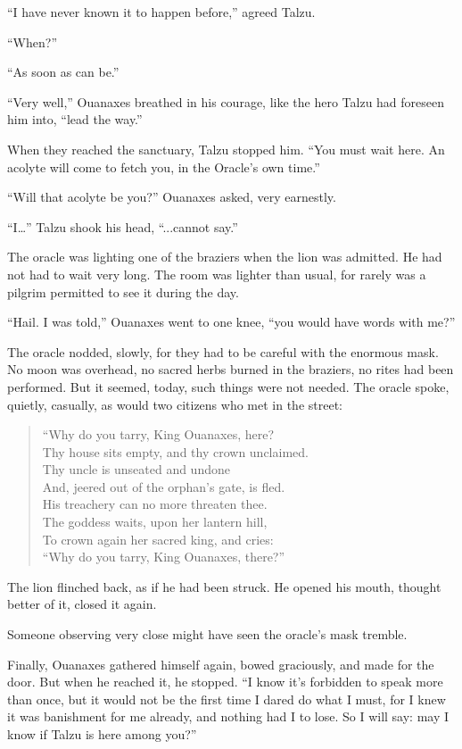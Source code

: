 ``I have never known it to happen before,'' agreed Talzu.

``When?''

``As soon as can be.''

``Very well,'' Ouanaxes breathed in his courage, like the hero Talzu had foreseen him into, ``lead the way.''

When they reached the sanctuary, Talzu stopped him. ``You must wait here. An acolyte will come to fetch you, in the Oracle's own time.''

``Will that acolyte be you?'' Ouanaxes asked, very earnestly.

``I\ldots'' Talzu shook his head, ``...cannot say.''

\secdiv

The oracle was lighting one of the braziers when the lion was admitted. He had not had to wait very long. The room was lighter than usual, for rarely was a pilgrim permitted to see it during the day.

``Hail. I was told,'' Ouanaxes went to one knee, ``you would have words with me?''

The oracle nodded, slowly, for they had to be careful with the enormous mask. No moon was overhead, no sacred herbs burned in the braziers, no rites had been performed. But it seemed, today, such things were not needed. The oracle spoke, quietly, casually, as would two citizens who met in the street:

\begin{verse}
``Why do you tarry, King Ouanaxes, here? \\
Thy house sits empty, and thy crown unclaimed. \\
Thy uncle is unseated and undone \\
And, jeered out of the orphan's gate, is fled. \\
His treachery can no more threaten thee. \\
The goddess waits, upon her lantern hill, \\
To crown again her sacred king, and cries:\\
``Why do you tarry, King Ouanaxes, there?''
\end{verse}

The lion flinched back, as if he had been struck. He opened his mouth, thought better of it, closed it again.

Someone observing very close might have seen the oracle's mask tremble.

Finally, Ouanaxes gathered himself again, bowed graciously, and made for the door. But when he reached it, he stopped. ``I know it's forbidden to speak more than once, but it would not be the first time I dared do what I must, for I knew it was banishment for me already, and nothing had I to lose. So I will say: may I know if Talzu is here among you?''

